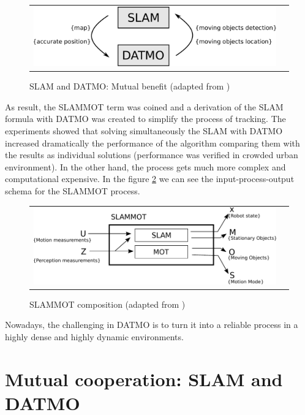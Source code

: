 \begin{figure}[h]
   \centering
     \begin{tabular}{lr}
       \includegraphics[scale=0.5]{img/fig:datmoslam:loop}
     \end{tabular}
   \caption{SLAM and DATMO: Mutual benefit (adapted from \cite{VU-2009-454238})}
   \label{fig:datmoslam:loop}
 \end{figure}

As result, the SLAMMOT term was coined and a derivation of the SLAM formula with DATMO was created to simplify the process of tracking. The experiments showed that solving simultaneously the SLAM with DATMO increased dramatically the performance of the algorithm comparing them with the results as individual solutions (performance was verified in crowded urban environment). In the other hand, the process gets much more complex and computational expensive. In the figure \ref{fig:slammot} we can see the input-process-output schema for the SLAMMOT process.

\begin{figure}[h]
   \centering
     \begin{tabular}{lr}
       \includegraphics[scale=0.9]{img/fig:slammot}
     \end{tabular}
   \caption{SLAMMOT composition (adapted from \cite{Wang04a})}
   \label{fig:slammot}
 \end{figure}

Nowadays, the challenging in DATMO is to turn it into a reliable process in a highly dense and highly dynamic environments.

\section{Mutual cooperation: SLAM and DATMO}

